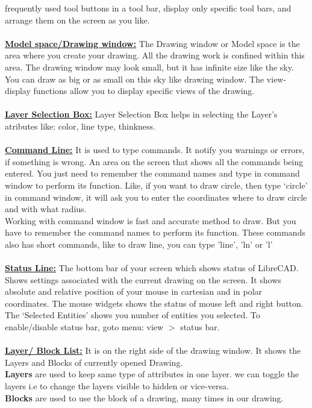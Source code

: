 frequently used tool buttons in a tool bar, display only specific tool bars, and arrange them on the screen as you like.\\\\
\textbf{\underline{Model space/Drawing window:}}
The Drawing window or Model space is the area where you create your drawing. All the drawing work is confined within this area. The drawing
window may look small, but it has infinite size like the sky. You can draw as big or as small on this sky like drawing window. The view-display functions allow you to display specific views of the drawing.\\\\
\textbf{\underline{Layer Selection Box:}}
Layer Selection Box helps in selecting the Layer's atributes like: color, line type, thinkness.\\\\
\textbf{\underline{Command Line:}}
It is used to type commands. It notify you warnings or errors, if something is wrong. An area on the screen that shows all the commands being entered. You just need to remember the command names and type in command window to perform its function. Like, if you want to draw circle, then type `circle' in command window, it will ask you to enter the coordinates where to draw circle and with what radius.\\
Working with command window is fast and accurate method to draw. But you have to remember the command names to perform its function. These commands also has short commands, like to draw line, you can type 'line', 'ln' or 'l'\\\\
\textbf{\underline{Status Line:}}
The bottom bar of your screen which shows status of LibreCAD. Shows settings associated with the current drawing on the screen. It shows absolute and relative position of your mouse in cartesian and in polar coordinates. The mouse widgets shows the status of mouse left and right button. The `Selected Entities' shows you number of entities you selected. To enable/disable status bar, goto menu:  view $>$ status bar.\\\\
\textbf{\underline{Layer/ Block List:}}
It is on the right side of the drawing window. It shows the Layers and Blocks of currently opened Drawing.\\
\textbf{Layers} are used to keep same type of attributes in one layer. we can toggle the layers i.e to change the layers visible to hidden or vice-versa.\\
\textbf{Blocks} are used to use the block of a drawing, many times in our drawing.\\\\
%

